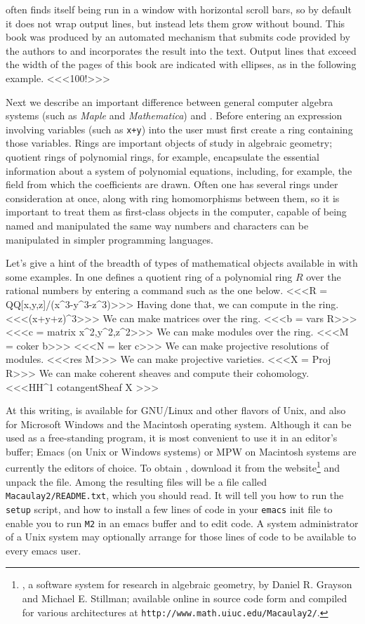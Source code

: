 \Mtwo often finds itself being run in a window with horizontal scroll bars,
so by default it does not wrap output lines, but instead lets them grow
without bound.  This book was produced by an automated mechanism that submits
code provided by the authors to \Mtwo and incorporates the result into the
text.  Output lines that exceed the width of the pages of this book are
indicated with ellipses, as in the following example.
<<<100!>>>

Next we describe an important difference between 
general computer algebra systems (such as {\sl Maple} and {\sl Mathematica})
and \Mtwo.  Before entering an expression involving variables (such as {\tt x+y})
into \Mtwo the user must first create a ring containing those variables.  
Rings are important
objects of study in algebraic geometry; quotient rings of polynomial rings,
for example, encapsulate the essential information about a system of
polynomial equations, including, for example, the field from which the
coefficients are drawn.  Often one has several rings under consideration at
once, along with ring homomorphisms between them, so it is important to treat
them as first-class objects in the computer, capable of being named and
manipulated the same way numbers and characters can be manipulated in simpler
programming languages.

Let's give a hint of the breadth of types of mathematical objects available
in \Mtwo with some examples.
In \Mtwo one defines a quotient ring of a polynomial ring $R$ over the
rational numbers by entering a command such as the one below.
<<<R = QQ[x,y,z]/(x^3-y^3-z^3)>>>
Having done that, we can compute in the ring.
<<<(x+y+z)^3>>>
We can make matrices over the ring.
<<<b = vars R>>>
<<<c = matrix {{x^2,y^2,z^2}}>>>
We can make modules over the ring.
<<<M = coker b>>>
<<<N = ker c>>>
We can make projective resolutions of modules.
<<<res M>>>
We can make projective varieties.
<<<X = Proj R>>>
We can make coherent sheaves and compute their  cohomology.
<<<HH^1 cotangentSheaf X >>>

At this writing, \Mtwo is available for GNU/Linux and other flavors of Unix, 
and also for Microsoft Windows and the Macintosh operating system. Although it can be used
as a free-standing program, it is most convenient to use it in an 
editor's buffer;
Emacs (on Unix or Windows systems) or MPW on Macintosh systems are
currently the editors of choice.
To obtain \Mtwo, download it from the
website\footnote{{\Mtwo}, a software system for research in algebraic geometry,
        by Daniel R. Grayson and Michael E. Stillman;
        available online in source code form and compiled for various architectures 
        at \texttt{http://www.math.uiuc.edu/Macaulay2/}.}
and unpack the file.
Among the resulting files will be a file called {\tt Macaulay2/README.txt},
which you should read.  It will tell you how to run the {\tt setup} script,
and how to install a few lines of code in your {\tt emacs} init file to
enable you to run {\tt M2} in an emacs buffer and to edit \Mtwo code.  A
system administrator of a Unix system may optionally arrange for those lines
of code to be available to every emacs user.

